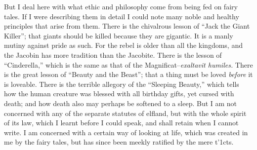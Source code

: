 \documentclass{book}
\begin{document}
But I deal here with what ethic and philosophy come from being fed on fairy tales. If I were describing them in detail I could note many noble and healthy principles that arise from them. There is the chivalrous lesson of “Jack the Giant Killer”; that giants should be killed because they are gigantic. It is a manly mutiny against pride as such. For the rebel is older than all the kingdoms, and the Jacobin has more tradition than the Jacobite. There is the lesson of “Cinderella,” which is the same as that of the Magnificat–\emph{exaltavit humiles.} There is the great lesson of “Beauty and the Beast”; that a thing must be loved \emph{before} it is loveable. There is the terrible allegory of the “Sleeping Beauty,” which tells how the human creature was blessed with all birthday gifts, yet cursed with death; and how death also may perhaps be softened to a sleep. But I am not concerned with any of the separate statutes of elfland, but with the whole spirit of its law, which I learnt before I could speak, and shall retain when I cannot write. I am concerned with a certain way of looking at life, which was created in me by the fairy tales, but has since been meekly ratified by the mere t’1cts.
\end{document}
